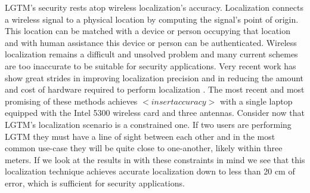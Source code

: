 \documentclass[12pt]{report}
\begin{document}
LGTM's security rests atop wireless localization's accuracy. Localization connects a wireless signal to a physical location by computing the signal's point of origin. This location can be matched with a device or person occupying that location and with human assistance this device or person can be authenticated. Wireless localization remains a difficult and unsolved problem and many current schemes are too inaccurate to be suitable for security applications. Very recent work has show great strides in improving localization precision and in reducing the amount and cost of hardware required to perform localization \cite{UbicarseKumar2014,SpotFiKotaru2015,ChronosSingleAPLocalizationVasisht2016}. The most recent and most promising of these methods \cite{ChronosSingleAPLocalizationVasisht2016} achieves $<insert accuracy>$ with a single laptop equipped with the Intel 5300 wireless card and three antennas. Consider now that LGTM's localization scenario is a constrained one. If two users are performing LGTM they must have a line of sight between each other and in the most common use-case they will be quite close to one-another, likely within three meters. If we look at the results in \cite{ChronosSingleAPLocalizationVasisht2016} with these constraints in mind we see that this localization technique achieves accurate localization down to less than 20 cm of error, which is sufficient for security applications. \par
\end{document}
